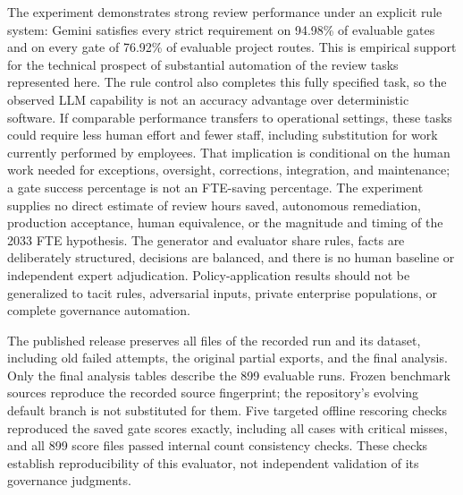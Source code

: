 The experiment demonstrates strong review performance under an explicit rule system: Gemini
satisfies every strict requirement on 94.98\% of evaluable gates and on every gate of 76.92\%
of evaluable project routes. This is empirical support for the technical prospect of substantial
automation of the review tasks represented here. The rule control also completes this fully
specified task, so the observed LLM capability is not an accuracy advantage over deterministic
software. If comparable performance transfers to operational
settings, these tasks could require less human effort and fewer staff, including substitution for
work currently performed by employees. That implication is conditional on the human work needed
for exceptions, oversight, corrections, integration, and maintenance; a gate success percentage
is not an FTE-saving percentage. The experiment supplies no direct estimate of review hours saved,
autonomous remediation, production acceptance, human equivalence, or the magnitude and timing
of the 2033 FTE hypothesis. The generator and evaluator share rules, facts are deliberately
structured, decisions are balanced, and there is no human baseline or independent expert
adjudication. Policy-application results should not be generalized to tacit rules, adversarial
inputs, private enterprise populations, or complete governance automation.

The published release preserves all files of the recorded run and its dataset, including old
failed attempts, the original partial exports, and the final analysis. Only the final analysis
tables describe the 899 evaluable runs. Frozen benchmark sources reproduce the recorded source
fingerprint; the repository's evolving default branch is not substituted for them. Five targeted
offline rescoring checks reproduced the saved gate scores exactly, including all cases with critical
misses, and all 899 score files passed internal count consistency checks. These checks establish
reproducibility of this evaluator, not independent validation of its governance judgments.
